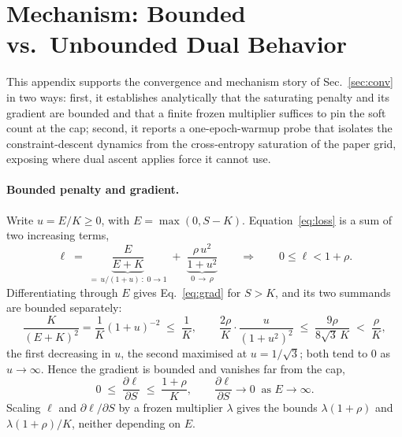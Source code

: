\documentclass[10pt]{article}
\begin{document}



\appendix

\section{Mechanism: Bounded vs.\ Unbounded Dual Behavior}
\label{app:mech}

This appendix supports the convergence and mechanism story of
Sec.~\ref{sec:conv} in two ways: first, it establishes analytically that
the saturating penalty and its gradient are bounded and that a finite
frozen multiplier suffices to pin the soft count at the cap; second, it
reports a one-epoch-warmup probe that isolates the constraint-descent
dynamics from the cross-entropy saturation of the paper grid, exposing
where dual ascent applies force it cannot use.

{\paragraph{Bounded penalty and gradient.}
Write $u=E/K\ge 0$, with $E=\max(0,S-K)$. Equation~\eqref{eq:loss} is a sum of two
increasing terms,
\[
\ell \;=\;
\underbrace{\frac{E}{E+K}}_{=\,u/(1+u)\,:\;0\to 1}
\;+\;
\underbrace{\frac{\rho\,u^{2}}{1+u^{2}}}_{0\,\to\,\rho}
\qquad\Longrightarrow\qquad
0\le\ell<1+\rho .
\]
Differentiating through $E$ gives Eq.~\eqref{eq:grad} for $S>K$, and its two summands are
bounded separately:
\[
\frac{K}{(E+K)^{2}}=\frac{1}{K}(1+u)^{-2}\;\le\;\frac{1}{K},
\qquad
\frac{2\rho}{K}\cdot\frac{u}{(1+u^{2})^{2}}\;\le\;\frac{9\rho}{8\sqrt3\,K}\;<\;\frac{\rho}{K},
\]
the first decreasing in $u$, the second maximised at $u=1/\sqrt3$; both tend to $0$ as
$u\to\infty$. Hence the gradient is bounded and vanishes far from the cap,
\[
0\;\le\;\frac{\partial\ell}{\partial S}\;\le\;\frac{1+\rho}{K},
\qquad
\frac{\partial\ell}{\partial S}\to 0 \ \text{ as } E\to\infty .
\]
Scaling $\ell$ and $\partial\ell/\partial S$ by a frozen multiplier $\lambda$ gives the
bounds $\lambda(1+\rho)$ and $\lambda(1+\rho)/K$, neither depending on $E$.
}
\end{document}
